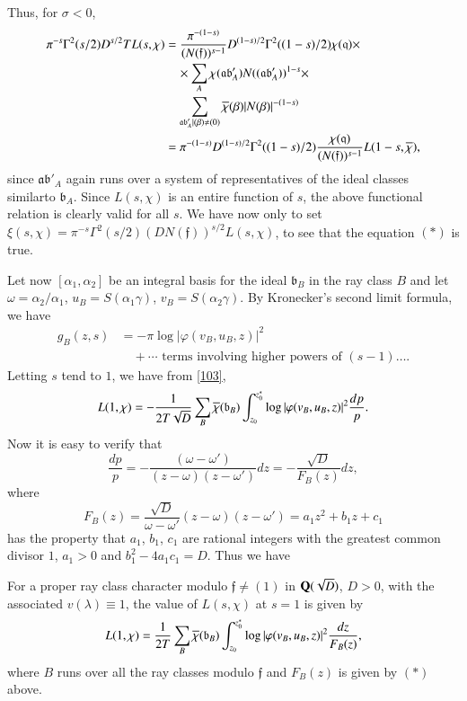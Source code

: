 Thus, for $\sigma<0$,
{\fontsize{10}{12}\selectfont
\begin{align*}
\pi^{-s}\Gamma^{2}(s/2)D^{s/2}TL(s,\chi) &=
\frac{\pi^{-(1-s)}}{(N(\mathfrak{f}))^{s-1}}D^{(1-s)/2}\Gamma^{2}((1-s)/2)\chi(\mathfrak{q})\times\\
&\quad
\times\sum_{A}\chi(\mathfrak{ab}'_{A})N((\mathfrak{ab}'_{A}))^{1-s}\times\\
&\quad \sum_{\mathfrak{ab}'_{A}|(\beta)\neq
  (0)}\overline{\chi}(\beta)|N(\beta)|^{-(1-s)}\\
&=
\pi^{-(1-s)}D^{(1-s)/2}\Gamma^{2}((1-s)/2)\frac{\chi(\mathfrak{q})}{(N(\mathfrak{f}))^{s-1}}L(1-s,\overline{\chi}), 
\end{align*}}\relax
since $\mathfrak{ab}'_{A}$ again runs over a system of representatives
of the ideal classes similar\pageoriginale to
$\mathfrak{b}_{A}$. Since $L(s,\chi)$ is an entire function of $s$,
the above functional relation is clearly valid for all $s$. We have
now only to set
$\xi(s,\chi)=\pi^{-s}\Gamma^{2}(s/2)(DN(\mathfrak{f}))^{s/2}L(s,\chi)$,
to see that the equation $(\ast)$ is true.

Let now $[\alpha_{1},\alpha_{2}]$ be an integral basis for the ideal
$\mathfrak{b}_{B}$ in the ray class $B$ and let
$\omega=\alpha_{2}/\alpha_{1}$, $u_{B}=S(\alpha_{1}\gamma)$,
$v_{B}=S(\alpha_{2}\gamma)$. By Kronecker's second limit formula, we
have
\begin{align*}
g_{B}(z,s) &= -\pi \log|\varphi(v_{B},u_{B},z)|^{2}\\
&\quad +\cdots\text{ terms involving higher powers of } (s-1)\ldots.
\end{align*}
Letting $s$ tend to $1$, we have from \eqref{103},
$$
L(1,\chi)=-\frac{1}{2T\sqrt{D}}\sum_{B}\overline{\chi}(\mathfrak{b}_{B})\int^{z^{\ast}_{0}}_{z_{0}}\log|\varphi(v_{B},u_{B},z)|^{2}\frac{dp}{p}.
$$
Now it is easy to verify that
$$
\frac{dp}{p}=-\frac{(\omega-\omega')}{(z-\omega)(z-\omega')}dz=-\frac{\sqrt{D}}{F_{B}(z)}dz,
$$
where 
\begin{equation*}
F_{B}(z)=\frac{\sqrt{D}}{\omega-\omega'}(z-\omega)(z-\omega')=a_{1}z^{2}+b_{1}z+c_{1}\tag{$\ast$}
\end{equation*}
has the property that $a_{1}$, $b_{1}$, $c_{1}$ are rational integers
with the greatest common divisor $1$, $a_{1}>0$ and
$b^{2}_{1}-4a_{1}c_{1}=D$. Thus we have

\begin{thm}\label{thm11}
For a proper ray class character modulo $\mathfrak{f}\neq (1)$ in\break
$\mathbf{Q}(\sqrt{D})$, $D>0$, with the associated $v(\lambda)\equiv 1$, the
value of $L(s,\chi)$ at $s=1$ is given by
$$
L(1,\chi)=\frac{1}{2T}\sum_{B}\overline{\chi}(\mathfrak{b}_{B})\int^{z^{\ast}_{0}}_{z_{0}}\log|\varphi(v_{B},u_{B},z)|^{2}\frac{dz}{F_{B}(z)},
$$
where $B$ runs over all the ray classes modulo $\mathfrak{f}$ and
$F_{B}(z)$ is given by $(\ast)$ above.
\end{thm}

